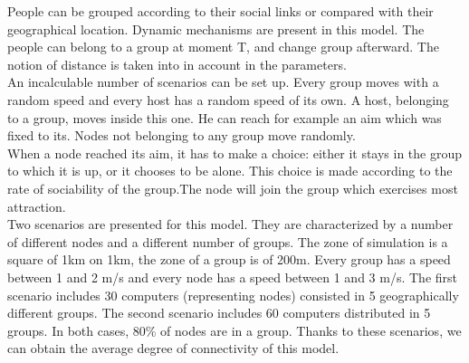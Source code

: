 People can be grouped according to their social links or compared with their geographical location. Dynamic mechanisms are present in this model. The people can belong to a group at moment T, and change group afterward. The notion of distance is taken into in account in the parameters.\\
An incalculable number of scenarios can be set up. Every group moves with a random speed and every host has a random speed of its own. A host, belonging to a group, moves inside this one. He can reach for example an aim which was fixed to its. Nodes not belonging to any group move randomly.\\

When a node reached its aim, it has to make a choice:
either it stays in the group to which it is up, or
it chooses to be alone.
This choice is made according to the rate of sociability of the group.The node will join the group which exercises most attraction.\\

Two scenarios are presented for this model. They are characterized by a number of different nodes and a different number of groups.  The zone of simulation is a square of 1km on 1km, the zone of a group is of 200m. Every group has a speed between 1 and 2 m/s and every node has a speed between 1 and 3 m/s. The first scenario includes 30 computers (representing nodes) consisted in 5 geographically different groups. The second scenario includes 60 computers distributed in 5 groups. In both cases, 80\% of nodes are in a group. Thanks to these scenarios, we can obtain the average degree of connectivity of this model.\\

